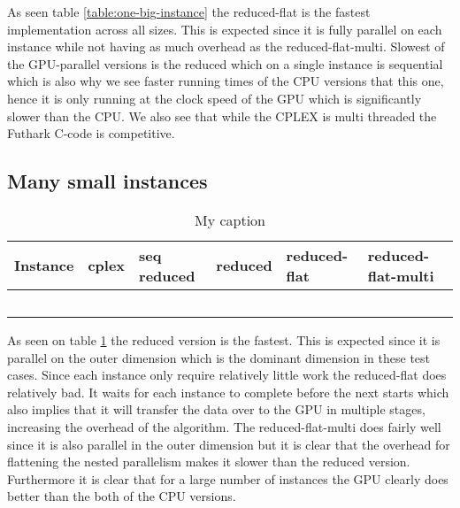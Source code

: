 As seen table \ref{table:one-big-instance} the reduced-flat is the fastest implementation across all sizes. This is expected since it is fully parallel on each instance while not having as much overhead as the reduced-flat-multi. Slowest of the GPU-parallel versions is the reduced which on a single instance is sequential which is also why we see faster running times of the CPU versions that this one, hence it is only running at the clock speed of the GPU which is significantly slower than the CPU. We also see that while the CPLEX is multi threaded the Futhark C-code is competitive.

\subsection{Many small instances}
\begin{table}[H]
	\centering
	\label{table:many_small_instances}
	\begin{tabular}{|l|l|l|l|l|l|}\hline
		Instance & cplex & seq reduced & reduced & reduced-flat & reduced-flat-multi \\\hline
		&       &             &         &              &                    \\\hline
		&       &             &         &              &                    \\\hline
		&       &             &         &              &                   \\\hline
		&       &             &         &              &                   \\\hline
		&       &             &         &              &                   \\\hline
	\end{tabular}
	\caption{My caption}
\end{table}


As seen on table \ref{table:many_small_instances} the reduced version is the fastest. This is expected since it is parallel on the outer dimension which is the dominant dimension in these test cases. Since each instance only require relatively little work the reduced-flat does relatively bad. It waits for each instance to complete before the next starts which also implies that it will transfer the data over to the GPU in multiple stages, increasing the overhead of the algorithm. The reduced-flat-multi does fairly well since it is also parallel in the outer dimension but it is clear that the overhead for flattening the nested parallelism makes it slower than the reduced version. Furthermore it is clear that for a large number of instances the GPU clearly does better than the both of the CPU versions.


